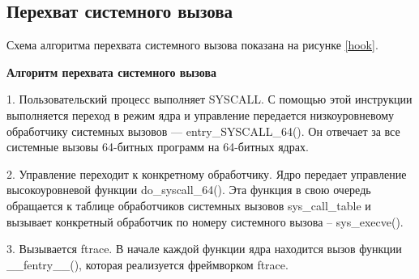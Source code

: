 \pagebreak

\subsection{Перехват системного вызова}

Схема алгоритма перехвата системного вызова показана на рисунке \ref{hook}.

\begin{figure}[H]
\end{figure}

\textbf{Алгоритм перехвата системного вызова}

1. Пользовательский процесс выполняет SYSCALL. С помощью этой инструкции выполняется переход в режим ядра и управление передается низкоуровневому обработчику системных вызовов — entry\_SYSCALL\_64(). Он отвечает за все системные вызовы 64-битных программ на 64-битных ядрах.

2. Управление переходит к конкретному обработчику. Ядро передает управление высокоуровневой функции do\_syscall\_64(). Эта функция в свою очередь обращается к таблице обработчиков системных вызовов sys\_call\_table и вызывает конкретный обработчик по номеру системного вызова -- sys\_execve().

3. Вызывается ftrace. В начале каждой функции ядра находится вызов функции \_\_fentry\_\_(), которая реализуется фреймворком ftrace.


